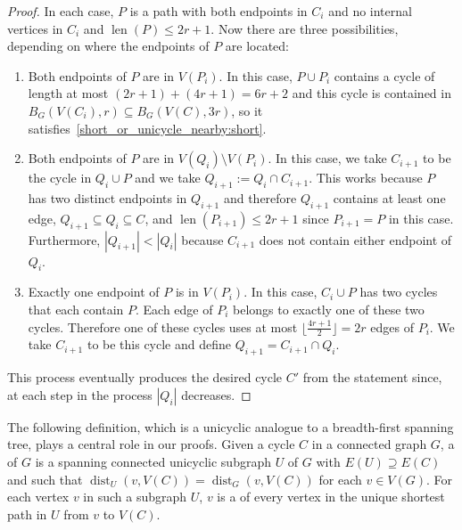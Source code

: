 \documentclass{patmorin}
\DeclareMathOperator{\len}{len}
\DeclareMathOperator{\dist}{dist}
\begin{document}
\begin{proof}
  In each case, $P$ is a path with both endpoints in $C_i$ and no internal vertices in $C_i$ and $\len(P)\le 2r+1$.  Now there are three possibilities, depending on where the endpoints of $P$ are located:
  \begin{enumerate}
    \item Both endpoints of $P$ are in $V(P_{i})$. In this case, $P\cup P_{i}$ contains a cycle of length at most $(2r+1)+(4r+1)=6r+2$ and this cycle is contained in $B_G(V(C_i),r)\subseteq B_G(V(C),3r)$, so it satisfies~\eqref{short_or_unicycle_nearby:short}.
    \item Both endpoints of $P$ are in $V(Q_{i})\setminus V(P_{i})$. In this case, we take $C_{i+1}$ to be the cycle in $Q_{i}\cup P$ and we take $Q_{i+1}:= Q_i\cap C_{i+1}$.  This works because $P$ has two distinct endpoints in $Q_{i+1}$ and therefore $Q_{i+1}$ contains at least one edge, $Q_{i+1}\subseteq Q_i\subseteq C$, and $\len(P_{i+1})\leq 2r+1$ since $P_{i+1}=P$ in this case. Furthermore, $|Q_{i+1}| < |Q_{i}|$ because $C_{i+1}$ does not contain either endpoint of $Q_{i}$.
    \item Exactly one endpoint of $P$ is in $V(P_{i})$. In this case, $C_{i}\cup P$ has two cycles that each contain $P$. Each edge of $P_{i}$ belongs to exactly one of these two cycles. Therefore one of these cycles uses at most $\lfloor\frac{4r+1}{2}\rfloor=2r$ edges of $P_{i}$. We take $C_{i+1}$ to be this cycle and define $Q_{i+1}=C_{i+1}\cap Q_i$. %
  \end{enumerate}
  This process eventually produces the desired cycle $C'$ from the statement since, at each step in the process $|Q_i|$ decreases.
\end{proof}

The following definition, which is a unicyclic analogue to a breadth-first spanning tree, plays a central role in our proofs. Given a cycle $C$ in a connected graph $G$, a  of $G$ is a spanning connected unicyclic subgraph $U$ of $G$ with $E(U)\supseteq E(C)$ and such that $\dist_U(v,V(C))=\dist_G(v,V(C))$ for each $v\in V(G)$.  For each vertex $v$ in such a subgraph $U$, $v$ is a  of every vertex in the unique shortest path in $U$ from $v$ to $V(C)$.
\end{document}
